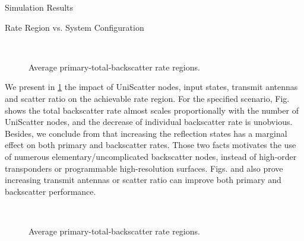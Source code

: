\documentclass[journal]{IEEEtran}
\begin{document}
\begin{section}{Simulation Results}
	\begin{subsection}{Rate Region vs. System Configuration}
		\begin{figure}[!t]
			\centering
			\\
			\caption{Average primary-total-backscatter rate regions.}
			\label{fi:region_config_1}
		\end{figure}

		We present in \ref{fi:region_config_1} the impact of UniScatter nodes, input states, transmit antennas and scatter ratio on the achievable rate region.
		For the specified scenario, Fig.  shows the total backscatter rate almost scales proportionally with the number of UniScatter nodes, and the decrease of individual backscatter rate is unobvious.
		Besides, we conclude from  that increasing the reflection states has a marginal effect on both primary and backscatter rates.
		Those two facts motivates the use of numerous elementary/uncomplicated backscatter nodes, instead of high-order transponders or programmable high-resolution surfaces.
		Figs.  and  also prove increasing transmit antennas or scatter ratio can improve both primary and backscatter performance.

		\begin{figure}[!t]
			\centering
			\\
			\caption{Average primary-total-backscatter rate regions.}
			\label{fi:region_config_2}
		\end{figure}


\end{subsection}
\end{section}
\end{document}
